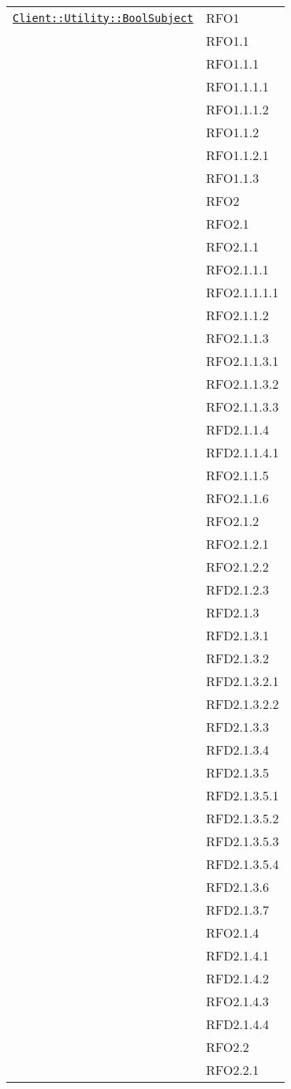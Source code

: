 \begin{longtable}{|>{\centering}m{10cm}|m{3cm}<{\centering}|}
\hyperref[Client::Utility::BoolSubject]{\texttt{Client::Utility::BoolSubject}} & RFO1\\
& RFO1.1\\
& RFO1.1.1\\
& RFO1.1.1.1\\
& RFO1.1.1.2\\
& RFO1.1.2\\
& RFO1.1.2.1\\
& RFO1.1.3\\
& RFO2\\
& RFO2.1\\
& RFO2.1.1\\
& RFO2.1.1.1\\
& RFO2.1.1.1.1\\
& RFO2.1.1.2\\
& RFO2.1.1.3\\
& RFO2.1.1.3.1\\
& RFO2.1.1.3.2\\
& RFO2.1.1.3.3\\
& RFD2.1.1.4\\
& RFD2.1.1.4.1\\
& RFO2.1.1.5\\
& RFO2.1.1.6\\
& RFO2.1.2\\
& RFO2.1.2.1\\
& RFO2.1.2.2\\
& RFD2.1.2.3\\
& RFD2.1.3\\
& RFD2.1.3.1\\
& RFD2.1.3.2\\
& RFD2.1.3.2.1\\
& RFD2.1.3.2.2\\
& RFD2.1.3.3\\
& RFD2.1.3.4\\
& RFD2.1.3.5\\
& RFD2.1.3.5.1\\
& RFD2.1.3.5.2\\
& RFD2.1.3.5.3\\
& RFD2.1.3.5.4\\
& RFD2.1.3.6\\
& RFD2.1.3.7\\
& RFO2.1.4\\
& RFD2.1.4.1\\
& RFD2.1.4.2\\
& RFO2.1.4.3\\
& RFD2.1.4.4\\
& RFO2.2\\
& RFO2.2.1\\

\end{longtable}
